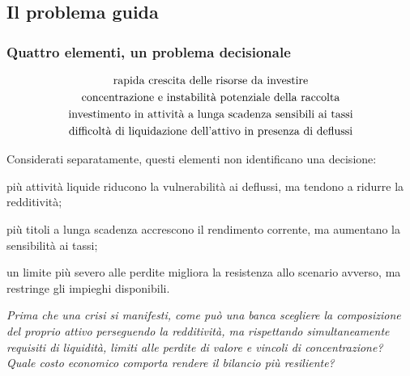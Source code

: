 



\subsection{Il problema guida}%

\begin{frame}%
%

\frametitle{Quattro elementi, un problema decisionale}%
%

%


{\small
\[%
\begin{array}
[c]{c}%
\mbox{rapida crescita delle risorse da investire}\\[3pt]%
\mbox{concentrazione e instabilit\`{a} potenziale della raccolta}\\[3pt]%
\mbox{investimento in attivit\`{a} a lunga scadenza sensibili ai tassi}\\[3pt]%
\mbox{difficolt\`{a} di liquidazione dell'attivo in presenza di deflussi}
\end{array}
\]
}

\medskip

Considerati separatamente, questi elementi non identificano una decisione:

\begin{stepitemize}
\item pi\`{u} attivit\`{a} liquide riducono la vulnerabilit\`{a} ai deflussi,
ma tendono a ridurre la redditivit\`{a};

\item pi\`{u} titoli a lunga scadenza accrescono il rendimento corrente, ma
aumentano la sensibilit\`{a} ai tassi;

\item un limite pi\`{u} severo alle perdite migliora la resistenza allo
scenario avverso, ma restringe gli impieghi disponibili.
\end{stepitemize}

\medskip

\begin{center}
{\small \emph{Prima che una crisi si manifesti, come pu\`{o} una banca
scegliere la composizione del proprio attivo perseguendo la redditivit\`{a},
ma rispettando simultaneamente requisiti di liquidit\`{a}, limiti alle perdite
di valore e vincoli di concentrazione? Quale costo economico comporta rendere
il bilancio pi\`{u} resiliente?}}
\end{center}

%

\transboxout
\end{frame}%


